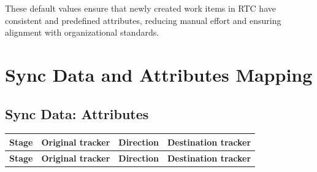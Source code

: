 These default values ensure that newly created work items in RTC have consistent
and predefined attributes, reducing manual effort and ensuring alignment with
organizational standards.

\newpage

\hypertarget{attr-mapping}{%
\section{Sync Data and Attributes Mapping}\label{attr-mapping}}

\subsection{Sync Data: Attributes}

\begin{longtable}{|l|l|l|l|}
   \hline
   \textbf{Stage} & \textbf{Original tracker} & \textbf{Direction} & \textbf{Destination tracker}\\
   \hline
   \endfirsthead

   \hline
   \textbf{Stage} & \textbf{Original tracker} & \textbf{Direction} & \textbf{Destination tracker}\\
   \hline
   \endhead


\end{longtable}
